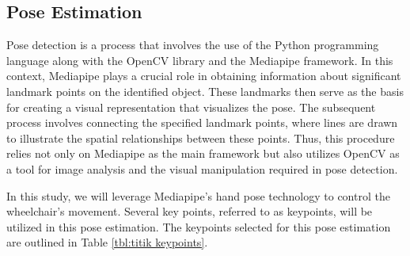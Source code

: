 \subsection{Pose Estimation}
Pose detection is a process that involves the use of the Python programming language along with the OpenCV library and the Mediapipe framework. In this context, Mediapipe plays a crucial role in obtaining information about significant landmark points on the identified object. These landmarks then serve as the basis for creating a visual representation that visualizes the pose. The subsequent process involves connecting the specified landmark points, where lines are drawn to illustrate the spatial relationships between these points. Thus, this procedure relies not only on Mediapipe as the main framework but also utilizes OpenCV as a tool for image analysis and the visual manipulation required in pose detection.

In this study, we will leverage Mediapipe's hand pose technology to control the wheelchair's movement. Several key points, referred to as keypoints, will be utilized in this pose estimation. The keypoints selected for this pose estimation are outlined in Table \ref{tbl:titik keypoints}.

